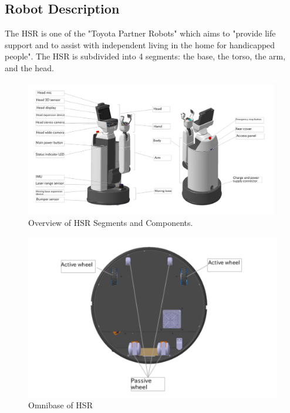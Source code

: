 \documentclass[12pt]{article}
\begin{document}
    \subsection{Robot Description}
        The HSR is one of the "Toyota Partner Robots" which aims to "provide life support and to assist with independent living in the home for handicapped people"\cite{noauthor_hsrb_manual_nodate}. The HSR is subdivided into 4 segments: the base, the torso, the arm, and the head. 
        \begin{figure}[ht]
            \includegraphics[width=\linewidth]{2020.05.07/hsr_overview.png}
            \centering
            \caption{Overview of HSR Segments and Components.\cite{noauthor_hsrb_manual_nodate}}
            \label{fig:hsrOverview}
        \end{figure}

        \begin{figure}[ht]
            \includegraphics[width=0.60\linewidth]{2020.05.07/hsr_base.png}
            \centering
            \caption{Omnibase of HSR \cite{noauthor_hsrb_manual_nodate}}
            \label{fig:hsrBase}
        \end{figure}

\end{document}
